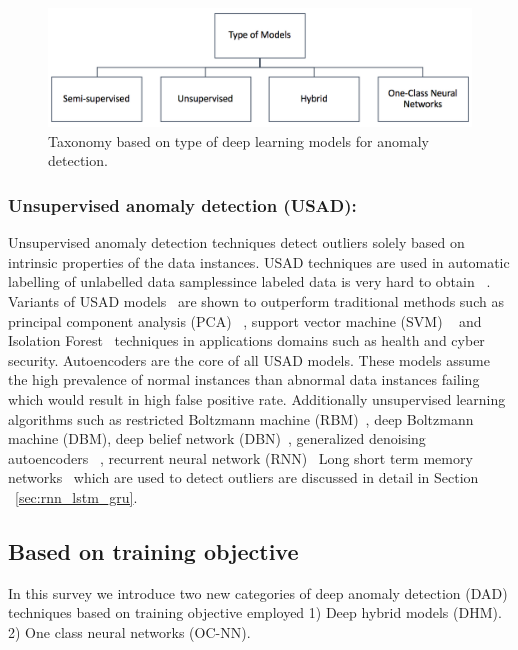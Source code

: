 \begin{figure}[h]
\includegraphics[scale=0.5]{images/TypeOfModels}
\captionsetup{justification=centering}
\caption{Taxonomy based on type of deep learning models for anomaly detection.}
\label{fig:typeOfModels}
\end{figure}

\subsubsection{Unsupervised anomaly detection (USAD):}
\label{sec:USAD}

Unsupervised anomaly detection techniques detect outliers solely based on intrinsic properties of the data instances. USAD techniques are used in automatic labelling of unlabelled data samplessince labeled data is very hard to obtain ~\cite{patterson2017deep}. Variants of USAD models~\cite{tuor2017deep} are shown to outperform traditional methods such as principal component analysis (PCA) ~\cite{wold1987principal}, support vector machine (SVM) ~\cite{cortes1995support} and Isolation Forest~\cite{liu2008isolation} techniques in applications domains such as health and cyber security.
Autoencoders are the core of all USAD models. These models assume the high prevalence of normal instances than abnormal data instances failing which would result in high false positive rate. Additionally unsupervised learning algorithms such as restricted Boltzmann machine (RBM)~\cite{sutskever2009recurrent}, deep Boltzmann machine (DBM), deep belief network (DBN)~\cite{salakhutdinov2010efficient}, generalized denoising autoencoders~\cite{vincent2008extracting} , recurrent neural network (RNN)~\cite{rodriguez1999recurrent} Long short term memory networks~\cite{lample2016neural} which are used to detect outliers are discussed in detail in Section ~\ref{sec:rnn_lstm_gru}.

\subsection{Based on training objective}
In this survey we introduce two new categories of deep anomaly detection (DAD) techniques based on training objective employed 1) Deep hybrid models (DHM). 2) One class neural networks (OC-NN).

